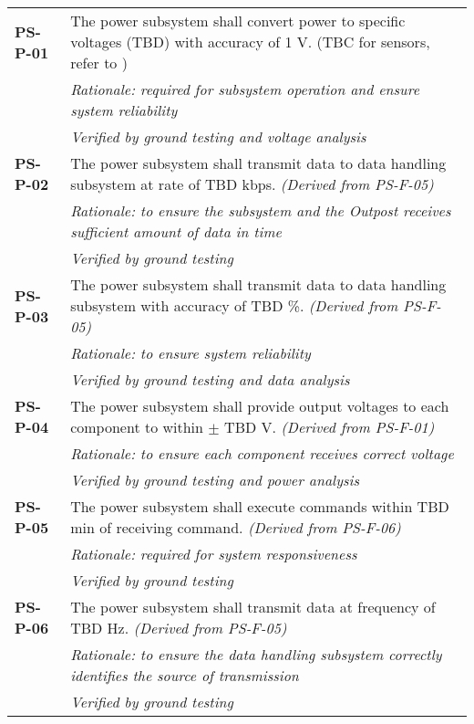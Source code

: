\begin{longtable}{P{2cm}P{13.25cm}}
\textbf{PS-P-01}	& The power subsystem shall convert power to specific voltages (TBD) with accuracy of 1 \gls{V}. (\gls{TBC} for sensors, refer to )\\
& \textit{Rationale: required for subsystem operation and ensure system reliability} \\
& \textit{Verified by ground testing and voltage analysis}	\\

\textbf{PS-P-02}	& The power subsystem shall transmit data to data handling subsystem at rate of \gls{TBD} \gls{kbps}. \textit{(Derived from PS-F-05)} \\
 & \textit{Rationale: to ensure the subsystem and the Outpost receives sufficient amount of data in time} \\
 & \textit{Verified by ground testing}				\\
 
\textbf{PS-P-03}	& The power subsystem shall transmit data to data handling subsystem with accuracy of \gls{TBD} \%. \textit{(Derived from PS-F-05)} \\
 & \textit{Rationale: to ensure system reliability} \\
 & \textit{Verified by ground testing and data analysis}	\\
 
\textbf{PS-P-04}	& The power subsystem shall provide output voltages to each component to within $\pm$ \gls{TBD} \gls{V}. \textit{(Derived from PS-F-01)} \\
 & \textit{Rationale: to ensure each component receives correct voltage} \\
 & \textit{Verified by ground testing and power analysis}	\\
 
\textbf{PS-P-05}	& The power subsystem shall execute commands within \gls{TBD} \gls{min} of receiving command. \textit{(Derived from PS-F-06)} \\
 & \textit{Rationale: required for system responsiveness} \\
 & \textit{Verified by ground testing}	\\
 
\textbf{PS-P-06}	& The power subsystem shall transmit data at frequency of \gls{TBD} \gls{Hz}. \textit{(Derived from PS-F-05)} \\
 & \textit{Rationale: to ensure the data handling subsystem correctly identifies the source of transmission} \\
 & \textit{Verified by ground testing}	
\end{longtable}

